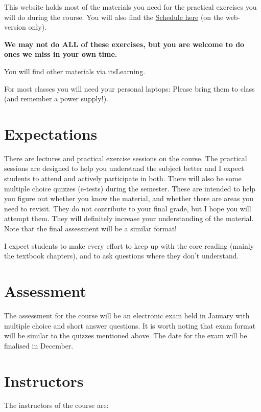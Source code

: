 \documentclass[
  a4paper]{book}
\begin{document}
This website holds most of the materials you need for the practical exercises you will do during the course. You will also find the \href{https://jonesor.github.io/BB512_Book/schedule.html}{Schedule here} (on the web-version only).

\textbf{We may not do ALL of these exercises, but you are welcome to do ones we miss in your own time.}

You will find other materials via itsLearning.

For most classes you will need your personal laptops: Please bring them to class (and remember a power supply!).

\section{Expectations}\label{expectations}

There are lectures and practical exercise sessions on the course. The practical sessions are designed to help you understand the subject better and I expect students to attend and actively participate in both. There will also be some multiple choice quizzes (e-tests) during the semester. These are intended to help you figure out whether you know the material, and whether there are areas you need to revisit. They do not contribute to your final grade, but I hope you will attempt them. They will definitely increase your understanding of the material. Note that the final assessment will be a similar format!

I expect students to make every effort to keep up with the core reading (mainly the textbook chapters), and to ask questions where they don't understand.

\section{Assessment}\label{assessment}

The assessment for the course will be an electronic exam held in January with multiple choice and short answer questions. It is worth noting that exam format will be similar to the quizzes mentioned above. The date for the exam will be finalised in December.

\section{Instructors}\label{instructors}

The instructors of the course are:
\end{document}

